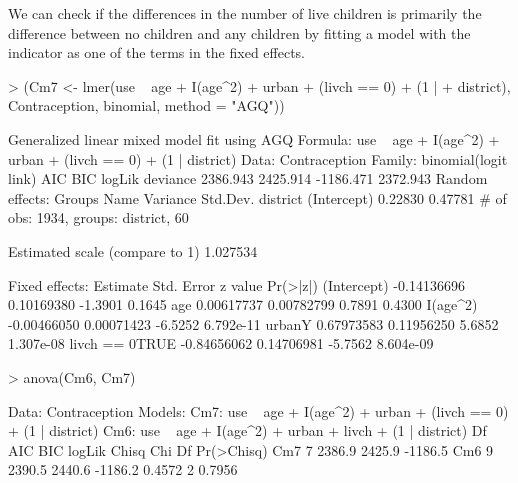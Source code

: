 \documentclass[12pt]{article}
\begin{document}
We can check if the differences in the number of live children is
primarily the difference between no children and any children by
fitting a model with the indicator  as one of the
terms in the fixed effects.
\begin{Schunk}
\begin{Sinput}
> (Cm7 <- lmer(use ~ age + I(age^2) + urban + (livch == 0) + (1 | 
+     district), Contraception, binomial, method = "AGQ"))
\end{Sinput}
\begin{Soutput}
Generalized linear mixed model fit using AGQ 
Formula: use ~ age + I(age^2) + urban + (livch == 0) + (1 | district) 
   Data: Contraception 
 Family: binomial(logit link)
      AIC      BIC    logLik deviance
 2386.943 2425.914 -1186.471 2372.943
Random effects:
     Groups        Name    Variance    Std.Dev. 
   district (Intercept)     0.22830     0.47781 
# of obs: 1934, groups: district, 60

Estimated scale (compare to 1)  1.027534 

Fixed effects:
                  Estimate  Std. Error z value  Pr(>|z|)
(Intercept)    -0.14136696  0.10169380 -1.3901    0.1645
age             0.00617737  0.00782799  0.7891    0.4300
I(age^2)       -0.00466050  0.00071423 -6.5252 6.792e-11
urbanY          0.67973583  0.11956250  5.6852 1.307e-08
livch == 0TRUE -0.84656062  0.14706981 -5.7562 8.604e-09
\end{Soutput}
\begin{Sinput}
> anova(Cm6, Cm7)
\end{Sinput}
\begin{Soutput}
Data: Contraception
Models:
Cm7: use ~ age + I(age^2) + urban + (livch == 0) + (1 | district)
Cm6: use ~ age + I(age^2) + urban + livch + (1 | district)
    Df     AIC     BIC  logLik  Chisq Chi Df Pr(>Chisq)
Cm7  7  2386.9  2425.9 -1186.5                         
Cm6  9  2390.5  2440.6 -1186.2 0.4572      2     0.7956
\end{Soutput}
\end{Schunk}
\end{document}
